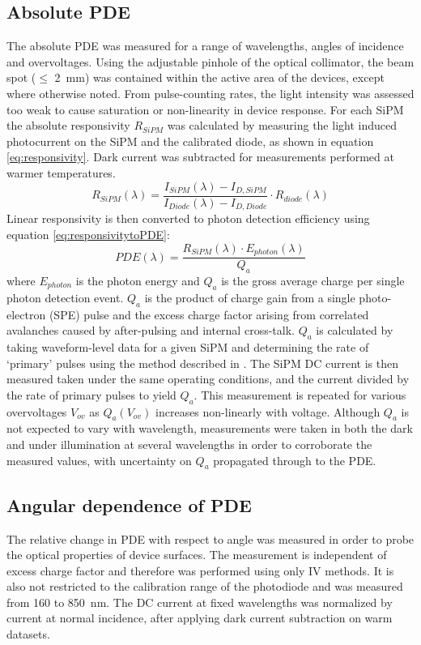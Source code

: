 \subsection{Absolute PDE}
\label{sec:measuring_absolutePDE}
The absolute PDE was measured for a range of wavelengths, angles of incidence and overvoltages. Using the adjustable pinhole of the optical collimator, the beam spot ($\leq$ 2~mm) was contained within the active area of the devices, except where otherwise noted. From pulse-counting rates, the light intensity was assessed too weak to cause saturation or non-linearity in device response. For each SiPM the absolute responsivity $R_{SiPM}$ was calculated by measuring the light induced photocurrent on the SiPM and the calibrated diode, as shown in equation \ref{eq:responsivity}. Dark current was subtracted for measurements performed at warmer temperatures.
\begin{equation}
    R_{SiPM}(\lambda) = \frac{I_{SiPM}(\lambda) - I_{D,SiPM}}{I_{Diode}(\lambda) - I_{D,Diode}} \cdot R_{diode}(\lambda)
    \label{eq:responsivity}
\end{equation}
Linear responsivity is then converted to photon detection efficiency using equation \ref{eq:responsivitytoPDE}:
\begin{equation}
    PDE(\lambda) = \frac{R_{SiPM}(\lambda) \cdot E_{photon}(\lambda)}{Q_a} 
    \label{eq:responsivitytoPDE}
\end{equation}
where $E_{photon}$ is the photon energy and $Q_a$ is the gross average charge per single photon detection event. $Q_a$ is the product of charge gain from a single photo-electron (SPE) pulse and the excess charge factor arising from correlated avalanches caused by after-pulsing and internal cross-talk. $Q_a$ is calculated by taking waveform-level data for a given SiPM and determining the rate of `primary' pulses using the method described in \cite{butcher_method_2017}. The SiPM DC current is then measured taken under the same operating conditions, and the current divided by the rate of primary pulses to yield $Q_a$. This measurement is repeated for various overvoltages $V_{ov}$ as $Q_a(V_{ov})$ increases non-linearly with voltage. Although $Q_a$ is not expected to vary with wavelength, measurements were taken in both the dark and under illumination at several wavelengths in order to corroborate the measured values, with uncertainty on $Q_a$ propagated through to the PDE. 

\subsection{Angular dependence of PDE}
\label{sec:measuring_relativePDE}
The relative change in PDE with respect to angle was measured in order to probe the optical properties of device surfaces. The measurement is independent of excess charge factor and therefore was performed using only IV methods. It is also not restricted to the calibration range of the photodiode and was measured from 160 to 850~nm. The DC current at fixed wavelengths was normalized by current at normal incidence, after applying dark current subtraction on warm datasets.

